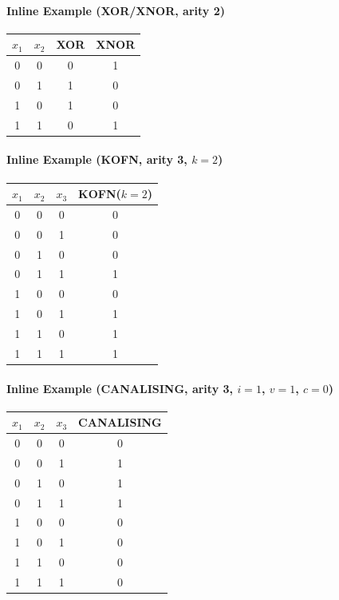 \documentclass[11pt]{article}
\begin{document}
\paragraph{Inline Example (XOR/XNOR, arity 2)}
\begin{center}
\begin{tabular}{cc|cc}
\toprule
$x_1$ & $x_2$ & XOR & XNOR \\
\midrule
0 & 0 & 0 & 1 \\
0 & 1 & 1 & 0 \\
1 & 0 & 1 & 0 \\
1 & 1 & 0 & 1 \\
\bottomrule
\end{tabular}
\end{center}
\paragraph{Inline Example (KOFN, arity 3, $k=2$)}
\begin{center}
\begin{tabular}{ccc|c}
\toprule
$x_1$ & $x_2$ & $x_3$ & KOFN($k=2$) \\
\midrule
0 & 0 & 0 & 0 \\
0 & 0 & 1 & 0 \\
0 & 1 & 0 & 0 \\
0 & 1 & 1 & 1 \\
1 & 0 & 0 & 0 \\
1 & 0 & 1 & 1 \\
1 & 1 & 0 & 1 \\
1 & 1 & 1 & 1 \\
\bottomrule
\end{tabular}
\end{center}
\paragraph{Inline Example (CANALISING, arity 3, $i=1$, $v=1$, $c=0$)}
\begin{center}
\begin{tabular}{ccc|c}
\toprule
$x_1$ & $x_2$ & $x_3$ & CANALISING \\
\midrule
0 & 0 & 0 & 0 \\
0 & 0 & 1 & 1 \\
0 & 1 & 0 & 1 \\
0 & 1 & 1 & 1 \\
1 & 0 & 0 & 0 \\
1 & 0 & 1 & 0 \\
1 & 1 & 0 & 0 \\
1 & 1 & 1 & 0 \\
\bottomrule
\end{tabular}
\end{center}
\end{document}
